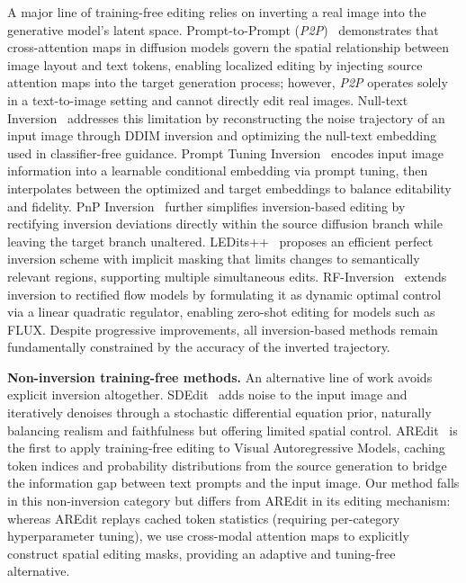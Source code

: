 A major line of training-free editing relies on inverting a real image into the generative model's latent space. Prompt-to-Prompt (\textit{P2P})~\cite{prompt2prompt} demonstrates that cross-attention maps in diffusion models govern the spatial relationship between image layout and text tokens, enabling localized editing by injecting source attention maps into the target generation process; however, \textit{P2P} operates solely in a text-to-image setting and cannot directly edit real images. Null-text Inversion~\cite{Null-text} addresses this limitation by reconstructing the noise trajectory of an input image through DDIM inversion and optimizing the null-text embedding used in classifier-free guidance. Prompt Tuning Inversion~\cite{Prompt-Tuning} encodes input image information into a learnable conditional embedding via prompt tuning, then interpolates between the optimized and target embeddings to balance editability and fidelity. PnP Inversion~\cite{PnP_Inversion} further simplifies inversion-based editing by rectifying inversion deviations directly within the source diffusion branch while leaving the target branch unaltered. LEDits++~\cite{LEDits++} proposes an efficient perfect inversion scheme with implicit masking that limits changes to semantically relevant regions, supporting multiple simultaneous edits. RF-Inversion~\cite{RF-inversion} extends inversion to rectified flow models by formulating it as dynamic optimal control via a linear quadratic regulator, enabling zero-shot editing for models such as FLUX. Despite progressive improvements, all inversion-based methods remain fundamentally constrained by the accuracy of the inverted trajectory.

\noindent\textbf{Non-inversion training-free methods.}
An alternative line of work avoids explicit inversion altogether. SDEdit~\cite{SDEdit} adds noise to the input image and iteratively denoises through a stochastic differential equation prior, naturally balancing realism and faithfulness but offering limited spatial control. AREdit~\cite{AREdit} is the first to apply training-free editing to Visual Autoregressive Models, caching token indices and probability distributions from the source generation to bridge the information gap between text prompts and the input image. Our method falls in this non-inversion category but differs from AREdit in its editing mechanism: whereas AREdit replays cached token statistics (requiring per-category hyperparameter tuning), we use cross-modal attention maps to explicitly construct spatial editing masks, providing an adaptive and tuning-free alternative.
